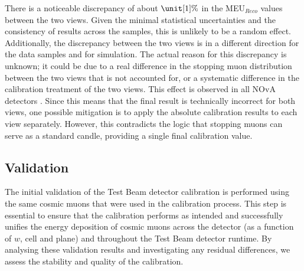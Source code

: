 
There is a noticeable discrepancy of about $\unit[1]{\%}$ in the \gls{MEU}$_{Reco}$ values between the two views. Given the minimal statistical uncertainties and the consistency of results across the samples, this is unlikely to be a random effect. Additionally, the discrepancy between the two views is in a different direction for the data samples and for simulation. The actual reason for this discrepancy is unknown; it could be due to a real difference in the stopping muon distribution between the two views that is not accounted for, or a systematic difference in the calibration treatment of the two views. This effect is observed in all \gls{NOvA} detectors \cite{NOvA-doc-60709}. Since this means that the final result is technically incorrect for both views, one possible mitigation is to apply the absolute calibration results to each view separately. However, this contradicts the logic that stopping muons can serve as a standard candle, providing a single final calibration value.

\subsection{Validation}\label{sec:TBCalibValidation}

The initial validation of the Test Beam detector calibration is performed using the same cosmic muons that were used in the calibration process. This step is essential to ensure that the calibration performs as intended and successfully unifies the energy deposition of cosmic muons across the detector (as a function of $w$, cell and plane) and throughout the Test Beam detector runtime. By analysing these validation results and investigating any residual differences, we assess the stability and quality of the calibration.

